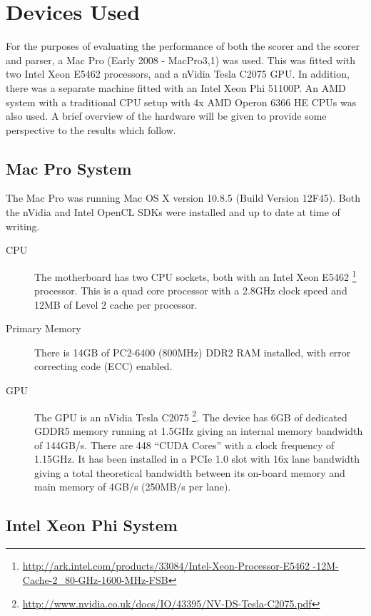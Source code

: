\section{Devices Used}

For the purposes of evaluating the performance of both the scorer and the scorer
and parser, a Mac Pro (Early 2008 - MacPro3,1) was used. This was fitted with
two Intel Xeon E5462 processors, and a nVidia Tesla C2075 GPU. In addition,
there was a separate machine fitted with an Intel Xeon Phi 51100P. An AMD system
with a traditional CPU setup with 4x AMD Operon 6366 HE CPUs was also used. A
brief overview of the hardware will be given to provide some perspective to the
results which follow.

\subsection{Mac Pro System}

The Mac Pro was running Mac OS X version 10.8.5 (Build Version 12F45). Both the
nVidia and Intel OpenCL SDKs were installed and up to date at time of writing.

\begin{description}

\item[CPU] The motherboard has two CPU sockets, both with an Intel Xeon E5462
\footnote{\url{http://ark.intel.com/products/33084/Intel-Xeon-Processor-E5462
-12M-Cache-2_80-GHz-1600-MHz-FSB}} processor. This is a quad core processor with
a 2.8GHz clock speed and 12MB of Level 2 cache per processor.

\item[Primary Memory] There is 14GB of PC2-6400 (800MHz) DDR2 RAM installed, with error
correcting code (ECC) enabled.

\item[GPU] The GPU is an nVidia Tesla C2075
\footnote{\url{http://www.nvidia.co.uk/docs/IO/43395/NV-DS-Tesla-C2075.pdf}}.
The device has 6GB of dedicated GDDR5 memory running at 1.5GHz giving an
internal memory bandwidth of 144GB/s. There are 448 ``CUDA Cores'' with a clock
frequency of 1.15GHz. It has been installed in a PCIe 1.0 slot with 16x lane
bandwidth giving a total theoretical bandwidth between its on-board memory and
main memory of 4GB/s (250MB/s per lane).

\end{description}

\subsection{Intel Xeon Phi System}

